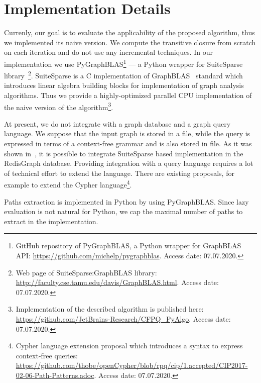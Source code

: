 \section{Implementation Details}

Currenly, our goal is to evaluate the applicability of the proposed algorithm, thus we implemented its naive version.
We compute the transitive closure from scratch on each iteration and do not use any incremental techniques.
In our implementation we use PyGraphBLAS\footnote{GitHub repository of PyGraphBLAS, a Python wrapper for GraphBLAS API: \url{https://github.com/michelp/pygraphblas}. Access date: 07.07.2020.} --- a Python wrapper for SuiteSparse library~\cite{10.1145/3322125}\footnote{Web page of SuiteSparse:GraphBLAS library: \url{http://faculty.cse.tamu.edu/davis/GraphBLAS.html}. Access date: 07.07.2020.}.
SuiteSparse is a C implementation of GraphBLAS~\cite{7761646} standard which introduces linear algebra building blocks for implementation of graph analysis algorithms.
Thus we provide a highly-optimized parallel CPU implementation of the naive version of the algorithm\footnote{Implementation of the described algorithm is published here: \url{https://github.com/JetBrains-Research/CFPQ_PyAlgo}. Access date: 07.07.2020.}.

At present, we do not integrate with a graph database and a graph query language.
We suppose that the input graph is stored in a file, while the query is expressed in terms of a context-free grammar and is also stored in file.
As it was shown in~\cite{10.1145/3398682.3399163}, it is possible to integrate SuiteSparse based implementation in the RedisGraph database.
Providing integration with a query language requires a lot of technical effort to extend the language.
There are existing proposals, for example to extend the Cypher language\footnote{Cypher language extension proposal which introduces a syntax to express context-free queries: \url{https://github.com/thobe/openCypher/blob/rpq/cip/1.accepted/CIP2017-02-06-Path-Patterns.adoc}. Access date: 07.07.2020.}.

Paths extraction is implemented in Python by using PyGraphBLAS.
Since lazy evaluation is not natural for Python, we cap the maximal number of paths to extract in the implementation.
